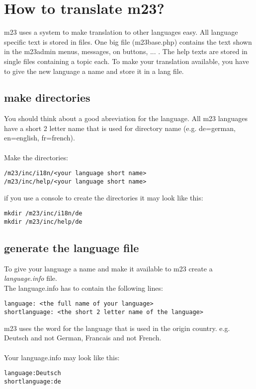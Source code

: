 \section{How to translate m23?}
m23 uses a system to make translation to other languages easy. All language specific text is stored in files. One big file (m23base.php) contains the text shown in the m23admin menus, messages, on buttons, ... . The help texts are stored in single files containing a topic each. To make your translation available, you have to give the new language a name and store it in a lang file.
\subsection{make directories}
You should think about a good abreviation for the language. All m23 languages have a short 2 letter name that is used for directory name (e.g. de=german, en=english, fr=french).\\\\
Make the directories:
\begin{verbatim}
/m23/inc/i18n/<your language short name>
/m23/inc/help/<your language short name>
\end{verbatim}
if you use a console to create the directories it may look like this:
\begin{verbatim}
mkdir /m23/inc/i18n/de
mkdir /m23/inc/help/de
\end{verbatim}
\subsection{generate the language file}
To give your language a name and make it available to m23 create a \textit{language.info} file.\\
The language.info has to contain the following lines:
\begin{verbatim}
language: <the full name of your language>
shortlanguage: <the short 2 letter name of the language>
\end{verbatim}
m23 uses the word for the language that is used in the origin country. e.g. Deutsch and not German, Francais and not French.\\\\
Your language.info may look like this:\\
\begin{verbatim}
language:Deutsch
shortlanguage:de
\end{verbatim}
